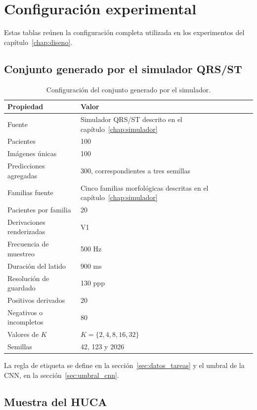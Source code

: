 \chapter{Configuración experimental}
\label{app:configuracion}

Estas tablas reúnen la configuración completa utilizada en los experimentos del capítulo~\ref{chap:diseno}.

\section{Conjunto generado por el simulador QRS/ST}

\begin{table}[H]
  \centering
  \small
  \begin{tabularx}{0.94\textwidth}{p{4.4cm}X}
    \toprule
    Propiedad & Valor \\
    \midrule
    Fuente & Simulador QRS/ST descrito en el capítulo~\ref{chap:simulador} \\
    Pacientes & 100 \\
    Imágenes únicas & 100 \\
    Predicciones agregadas & 300, correspondientes a tres semillas \\
    Familias fuente & Cinco familias morfológicas descritas en el capítulo~\ref{chap:simulador} \\
    Pacientes por familia & 20 \\
    Derivaciones renderizadas & V1 \\
    Frecuencia de muestreo & 500 Hz \\
    Duración del latido & 900 ms \\
    Resolución de guardado & 130 ppp \\
    Positivos derivados & 20 \\
    Negativos o incompletos & 80 \\
    Valores de \(K\) & \(K=\{2,4,8,16,32\}\) \\
    Semillas & 42, 123 y 2026 \\
    \bottomrule
  \end{tabularx}
  \caption{Configuración del conjunto generado por el simulador.}
  \label{tab:config_sintetico_final}
\end{table}

La regla de etiqueta se define en la sección~\ref{sec:datos_tareas} y el umbral de la CNN, en la sección~\ref{sec:umbral_cnn}.

\section{Muestra del HUCA}

